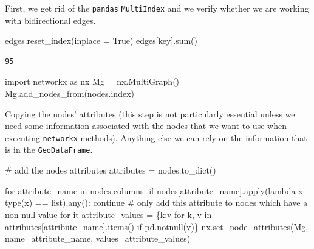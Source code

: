 \documentclass[
  letterpaper,
  DIV=11,
  numbers=noendperiod]{scrreprt}
\newenvironment{Shaded}{\begin{snugshade}}{\end{snugshade}}
\newcommand{\BuiltInTok}[1]{\textcolor[rgb]{0.00,0.23,0.31}{#1}}
\newcommand{\CommentTok}[1]{\textcolor[rgb]{0.37,0.37,0.37}{#1}}
\newcommand{\ControlFlowTok}[1]{\textcolor[rgb]{0.00,0.23,0.31}{#1}}
\newcommand{\ImportTok}[1]{\textcolor[rgb]{0.00,0.46,0.62}{#1}}
\newcommand{\KeywordTok}[1]{\textcolor[rgb]{0.00,0.23,0.31}{#1}}
\newcommand{\NormalTok}[1]{\textcolor[rgb]{0.00,0.23,0.31}{#1}}
\newcommand{\OperatorTok}[1]{\textcolor[rgb]{0.37,0.37,0.37}{#1}}
\newcommand{\StringTok}[1]{\textcolor[rgb]{0.13,0.47,0.30}{#1}}
\newcommand{\VariableTok}[1]{\textcolor[rgb]{0.07,0.07,0.07}{#1}}
\begin{document}
First, we get rid of the \texttt{pandas} \texttt{MultiIndex} and we
verify whether we are working with bidirectional edges.

\begin{Shaded}
\begin{Highlighting}[]
\NormalTok{edges.reset\_index(inplace }\OperatorTok{=} \VariableTok{True}\NormalTok{)}
\NormalTok{edges[}\StringTok{\textquotesingle{}key\textquotesingle{}}\NormalTok{].}\BuiltInTok{sum}\NormalTok{()}
\end{Highlighting}
\end{Shaded}

\begin{verbatim}
95
\end{verbatim}

\begin{Shaded}
\begin{Highlighting}[]
\ImportTok{import}\NormalTok{ networkx }\ImportTok{as}\NormalTok{ nx}
\NormalTok{Mg }\OperatorTok{=}\NormalTok{ nx.MultiGraph()   }
\NormalTok{Mg.add\_nodes\_from(nodes.index)}
\end{Highlighting}
\end{Shaded}

Copying the nodes' attributes (this step is not particularly essential
unless we need some information associated with the nodes that we want
to use when executing \texttt{networkx} methods). Anything else we can
rely on the information that is in the \texttt{GeoDataFrame}.

\begin{Shaded}
\begin{Highlighting}[]
\CommentTok{\# add the nodes\textquotesingle{} attributes}
\NormalTok{attributes }\OperatorTok{=}\NormalTok{ nodes.to\_dict()}

\ControlFlowTok{for}\NormalTok{ attribute\_name }\KeywordTok{in}\NormalTok{ nodes.columns:}
    \ControlFlowTok{if}\NormalTok{ nodes[attribute\_name].}\BuiltInTok{apply}\NormalTok{(}\KeywordTok{lambda}\NormalTok{ x: }\BuiltInTok{type}\NormalTok{(x) }\OperatorTok{==} \BuiltInTok{list}\NormalTok{).}\BuiltInTok{any}\NormalTok{(): }
        \ControlFlowTok{continue} 
    \CommentTok{\# only add this attribute to nodes which have a non{-}null value for it}
\NormalTok{    attribute\_values }\OperatorTok{=}\NormalTok{ \{k:v }\ControlFlowTok{for}\NormalTok{ k, v }\KeywordTok{in}\NormalTok{ attributes[attribute\_name].items() }\ControlFlowTok{if}\NormalTok{ pd.notnull(v)\}}
\NormalTok{    nx.set\_node\_attributes(Mg, name}\OperatorTok{=}\NormalTok{attribute\_name, values}\OperatorTok{=}\NormalTok{attribute\_values)}
\end{Highlighting}
\end{Shaded}
\end{document}
